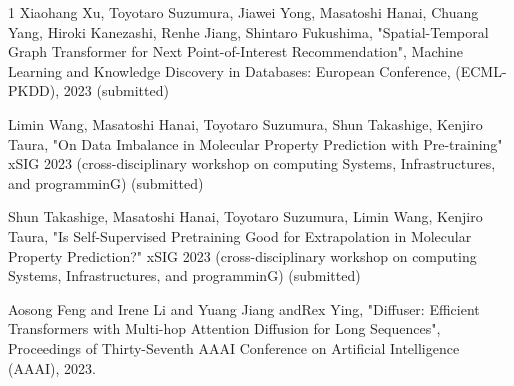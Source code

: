 \begin{査読付}{1}
Xiaohang Xu, Toyotaro Suzumura, Jiawei Yong, Masatoshi Hanai, Chuang Yang, Hiroki Kanezashi, Renhe Jiang, Shintaro Fukushima, "Spatial-Temporal Graph Transformer for Next Point-of-Interest Recommendation", Machine Learning and Knowledge Discovery in Databases: European Conference, (ECML-PKDD), 2023 (submitted)


Limin Wang, Masatoshi Hanai, Toyotaro Suzumura, Shun Takashige, Kenjiro Taura, "On Data Imbalance in Molecular Property Prediction with Pre-training" xSIG 2023 (cross-disciplinary workshop on computing Systems, Infrastructures, and programminG)  (submitted)

Shun Takashige, Masatoshi Hanai, Toyotaro Suzumura, Limin Wang, Kenjiro Taura, "Is Self-Supervised Pretraining Good for Extrapolation in Molecular Property Prediction?" xSIG 2023 (cross-disciplinary workshop on computing Systems, Infrastructures, and programminG) (submitted)




Aosong Feng and Irene Li and Yuang Jiang andRex  Ying, "Diffuser: Efficient Transformers with Multi-hop Attention Diffusion for Long Sequences", Proceedings of Thirty-Seventh AAAI Conference on Artificial Intelligence (AAAI), 2023.

\end{査読付}



